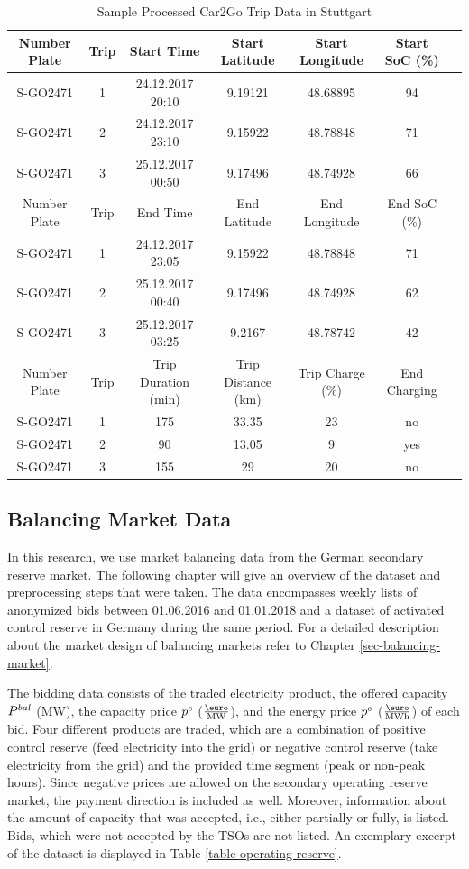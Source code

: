 \documentclass[a4paper, 12pt]{article}
\begin{document}
\begin{table}
    \caption{Sample Processed Car2Go Trip Data in Stuttgart \label{table-car2go-processed}}
    \centering
    \begin{tabular}{cc|ccccc}
      \hline
      \hline
      Number Plate & Trip & Start Time & Start Latitude & Start Longitude & Start SoC (\%)\\
      \hline
      S-GO2471 & 1 & 24.12.2017 20:10 & 9.19121 & 48.68895 & 94\\
      S-GO2471 & 2 & 24.12.2017 23:10 & 9.15922 & 48.78848 & 71\\
      S-GO2471 & 3 & 25.12.2017 00:50 & 9.17496 & 48.74928 & 66\\
      \hline
      Number Plate & Trip & End Time & End Latitude & End Longitude & End SoC (\%)\\
      \hline
      S-GO2471 & 1 & 24.12.2017 23:05 & 9.15922 & 48.78848 & 71\\
      S-GO2471 & 2 & 25.12.2017 00:40 & 9.17496 & 48.74928 & 62\\
      S-GO2471 & 3 & 25.12.2017 03:25 & 9.2167 & 48.78742 & 42\\
      \hline
      Number Plate & Trip & Trip Duration (min) & Trip Distance (km) & Trip Charge (\%) & End Charging\\
      \hline
      S-GO2471 & 1 & 175 & 33.35 & 23 & no\\
      S-GO2471 & 2 & 90 & 13.05 & 9 & yes\\
      S-GO2471 & 3 & 155 & 29 & 20 & no\\
      \hline
      \hline
    \end{tabular}
\end{table}

\subsection{Balancing Market Data}
\label{sec:org559dfa5}
In this research, we use market balancing data from the German secondary reserve
market. The following chapter will give an overview of the dataset and
preprocessing steps that were taken. The data encompasses weekly lists of
anonymized bids between 01.06.2016 and 01.01.2018 and a dataset of activated
control reserve in Germany during the same period. For a detailed description
about the market design of balancing markets refer to Chapter
\ref{sec-balancing-market}.

The bidding data consists of the traded electricity product, the offered
capacity \(P^{bal}_{}\) (MW), the capacity price \(p^c_{}\) (\(\emw\)), and the
energy price \(p^e_{}\) (\(\emwh\)) of each bid. Four different products
are traded, which are a combination of positive control reserve (feed
electricity into the grid) or negative control reserve (take electricity from
the grid) and the provided time segment (peak or non-peak hours). Since negative
prices are allowed on the secondary operating reserve market, the payment
direction is included as well. Moreover, information about the amount of
capacity that was accepted, i.e., either partially or fully, is listed. Bids,
which were not accepted by the TSOs are not listed. An exemplary excerpt of the
dataset is displayed in Table \ref{table-operating-reserve}.
\end{document}
